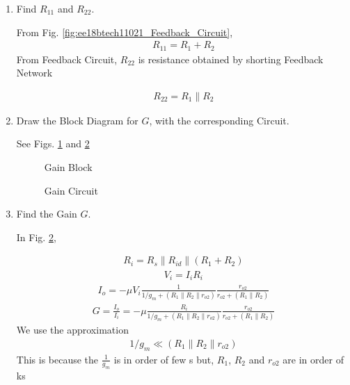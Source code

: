 \begin{enumerate}[label=\thesection.\arabic*.,ref=\thesection.\theenumi]
\item Find $R_{11}$ and $R_{22}$. 

\solution From  Fig. \ref{fig:ee18btech11021_Feedback_Circuit},
\begin{align}
    R_{11} = R_{1} + R_{2}
\end{align}
From Feedback Circuit, $R_{22}$ is resistance obtained by shorting Feedback Network

\begin{align}
    R_{22} = R_{1} \parallel R_{2}
\end{align}

\item Draw the Block Diagram for $G$, with the corresponding Circuit.

\solution See Figs. \ref{fig:ee18btech11021_Gain_Block}
and \ref{fig:ee18btech11021_Gain_Circuit}


\renewcommand{\thefigure}{\theenumi.\arabic{figure}}
\begin{figure}[!ht]
	\begin{center}
		\resizebox{\columnwidth}{!}{}
	\end{center}
\caption{Gain Block}
\label{fig:ee18btech11021_Gain_Block}
\end{figure}
%
\begin{figure}[!ht]
	\begin{center}
		\resizebox{\columnwidth}{!}{}
	\end{center}
\caption{Gain Circuit}
\label{fig:ee18btech11021_Gain_Circuit}
\end{figure}
\renewcommand{\thefigure}{\theenumi}

\item Find the Gain $G$.

\solution In Fig. \ref{fig:ee18btech11021_Gain_Circuit},


\begin{align}
    R_{i}=R_{s}\parallel R_{i d}\parallel(R_{1}+R_{2})
\end{align}
\begin{align}
    V_{i}=I_{i} R_{i}
\end{align}
\begin{align}
    I_{o}=-\mu V_{i} \frac{1}{1 / g_{m}+(R_{1}\parallel R_{2}\parallel r_{o 2})} \frac{r_{o 2}}{r_{o 2}+(R_{1} \parallel R_{2})}
\end{align}
\begin{align}
    G = \frac{I_{o}}{I_{i}}=-\mu \frac{R_{i}}{1 / g_{m}+(R_{1}\parallel R_{2}\parallel r_{o 2})} \frac{r_{o 2}}{r_{o 2}+(R_{1} \parallel R_{2})}
\end{align}
We use the approximation
\begin{align}
    1 / g_{m} \ll (R_{1}\parallel R_{2}\parallel r_{o 2})
\end{align}
This is because the $\frac{1}{g_{m}}$ is in order of few \ohm s but, $R_{1}$, $R_{2}$ and $r_{o2}$ are in order of k\ohm s 


\end{enumerate}
